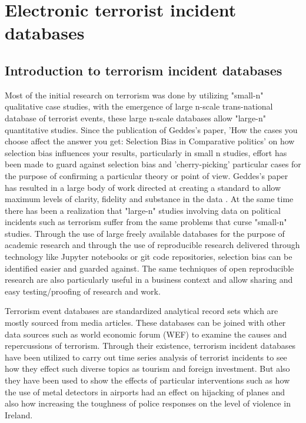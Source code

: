\chapter{Electronic terrorist incident databases}

\section{Introduction to terrorism incident databases}
Most of the initial research on terrorism was done by utilizing "small-n" qualitative case studies, with the emergence of large n-scale trans-national database of terrorist events, these large n-scale databases allow "large-n" quantitative studies. 
Since the publication of Geddes's paper, 'How the cases you choose affect the answer you get: Selection Bias in Comparative politics' \citep{geddes1990cases} on how selection bias influences your results, particularly in small n studies, effort has been made to guard against selection bias and 'cherry-picking' particular cases for the purpose of confirming a particular theory or point of view. Geddes's paper has resulted in a large body of work directed at creating a standard to allow maximum levels of clarity, fidelity and substance in the data \citep{geddes1990cases}. At the same time there has been a realization that "large-n" studies involving data on political incidents such as terrorism suffer from the same problems that curse "small-n" studies. Through the use of large freely available databases for the purpose of academic research and through the use of reproducible research delivered through technology like Jupyter notebooks \citep{kluyver2016jupyter} or git code repositories,  selection bias can be identified easier and guarded against. The same techniques of open reproducible research are also particularly useful in a business context and allow sharing and easy testing/proofing of research and work. 
 
Terrorism event databases are standardized analytical record sets which are mostly sourced from media articles. These databases can be joined with other data sources such as world economic forum (WEF) to examine the causes and repercussions of terrorism. Through their existence, terrorism incident databases have been utilized to carry out time series analysis of terrorist incidents to see how they effect such diverse topics as tourism \citep{van2015terrorism} and foreign investment. But also they have been used to show the effects of particular interventions such as how the use of metal detectors in airports had an effect on hijacking of planes and also how increasing the toughness of police responses on the level of violence in Ireland.

